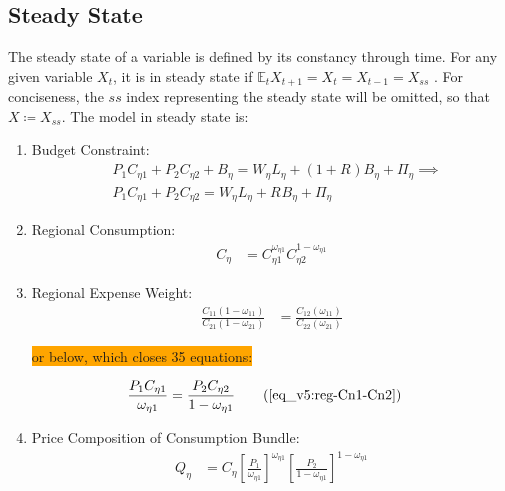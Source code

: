 \documentclass[../thesis.tex]{subfiles}
\begin{document}
\newpage


\subsection{Steady State}

The steady state of a variable is defined by its constancy through time. For any given variable $X_t$, it is in steady state if $\mathbb{E}_t X_{t+1} = X_t = X_{t-1} = X_{ss}$ \cite[p.41]{costa_junior_understanding_2016}. For conciseness, the $ss$ index representing the steady state will be omitted, so that $X \coloneq X_{ss}$. The model in steady state is:

\begin{enumerate}
	
	\item Budget Constraint:
	\begin{align}
		& P_{1} C_{\eta 1} + P_{2} C_{\eta 2} + B_{\eta} = W_{\eta} L_{\eta} + (1 + R_{}) B_{\eta} + \Pi_{\eta} \implies \nonumber \\
		& P_{1} C_{\eta 1} + P_{2} C_{\eta 2} = W_{\eta} L_{\eta} + R_{} B_{\eta} + \Pi_{\eta} \label{eq_v5:reg-ss-budget-constrain}
	\end{align}
	
	\item Regional Consumption:
	\begin{align}
		C_{\eta} &= C_{\eta 1}^{\omega_{\eta 1}} C_{\eta 2}^{1-\omega_{\eta 1}} \label{eq_v5:reg-ss-consumption-aggregation}
	\end{align}
	
	\item Regional Expense Weight:
	\begin{align}
		\frac{C_{11}(1-\omega_{11})}{C_{21}(1-\omega_{21})} &= \frac{C_{12}(\omega_{11})}{C_{22}(\omega_{21})} \label{eq_v5:reg-ss-Cn1-Cn2-b}
	\end{align}
	
	\colorbox{orange}{or below, which closes 35 equations:}
	
	\begin{align}
		\frac{P_{1} C_{\eta 1}}{\omega_{\eta 1}} &= \frac{P_{2} C_{\eta 2}}{1 -\omega_{\eta 1}} \tag{\ref{eq_v5:reg-Cn1-Cn2}}
	\end{align}
	
	\item Price Composition of Consumption Bundle:
	\begin{align}
		Q_{\eta} &= C_{\eta} \left[ \frac{P_{1}}{\omega_{\eta 1}} \right]^{\omega_{\eta 1}} \left[ \frac{P_{2}}{1 -\omega_{\eta 1}} \right]^{1 -\omega_{\eta 1}} \label{eq_v5:reg-ss-total-expense-level}
	\end{align}
	

\end{enumerate}
\end{document}
